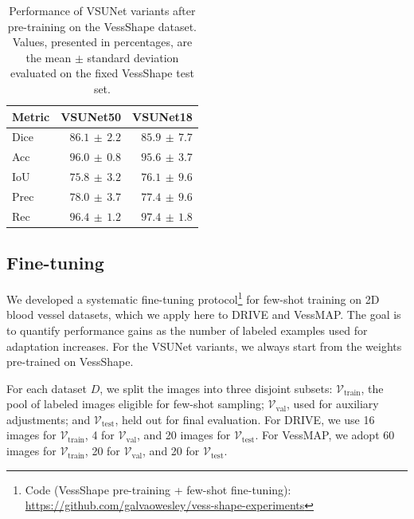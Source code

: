 \documentclass[%
reprint,
nofootinbib,
 amsmath,amssymb,
aps,
superscriptaddress,
showkeys,
longbibliography
]{revtex4-1}
\begin{document}
\begin{table}[t]
    \caption{Performance of VSUNet variants after pre-training on the VessShape dataset. Values, presented in percentages, are the mean $\pm$ standard deviation evaluated on the fixed VessShape test set.}
    \label{tab:vessshape_results_percent}
    \centering
    \begingroup
    \small
    \setlength{\tabcolsep}{6pt}
    \renewcommand{\arraystretch}{1.15}
    \begin{tabular}{l r r}
        \hline
        	\textbf{Metric} & \textbf{VSUNet50} & \textbf{VSUNet18} \\
        \hline
        Dice & $86.1 \,\pm\, 2.2$ & $85.9 \,\pm\, 7.7$ \\
        Acc & $96.0 \,\pm\, 0.8$ & $95.6 \,\pm\, 3.7$ \\
        IoU & $75.8 \,\pm\, 3.2$ & $76.1 \,\pm\, 9.6$ \\
        Prec & $78.0 \,\pm\, 3.7$ & $77.4 \,\pm\, 9.6$ \\
        Rec & $96.4 \,\pm\, 1.2$ & $97.4 \,\pm\, 1.8$ \\
        \hline
    \end{tabular}
    \endgroup
\end{table}

\subsection{Fine-tuning}

We developed a systematic fine-tuning protocol\footnote{Code (VessShape pre-training + few-shot fine-tuning): \url{https://github.com/galvaowesley/vess-shape-experiments} } for few-shot training on 2D blood vessel datasets, which we apply here to DRIVE and VessMAP. The goal is to quantify performance gains as the number of labeled examples used for adaptation increases. For the VSUNet variants, we always start from the weights pre-trained on VessShape.

For each dataset $D$, we split the images into three disjoint subsets: $\mathcal{V}_{\text{train}}$, the pool of labeled images eligible for few-shot sampling; $\mathcal{V}_{\text{val}}$, used for auxiliary adjustments; and $\mathcal{V}_{\text{test}}$, held out for final evaluation. For DRIVE, we use 16 images for $\mathcal{V}_{\text{train}}$, 4 for $\mathcal{V}_{\text{val}}$, and 20 images for $\mathcal{V}_{\text{test}}$. For VessMAP, we adopt 60 images for $\mathcal{V}_{\text{train}}$, 20 for $\mathcal{V}_{\text{val}}$, and 20 for $\mathcal{V}_{\text{test}}$.
\end{document}
